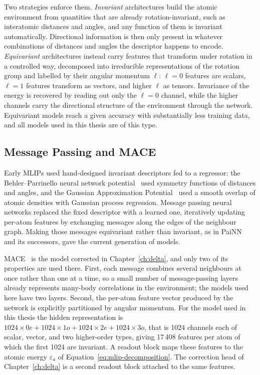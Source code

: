 Two strategies enforce them. \emph{Invariant} architectures build the atomic
environment from quantities that are already rotation-invariant, such as interatomic
distances and angles, and any function of them is invariant automatically. Directional
information is then only present in whatever combinations of distances and angles the
descriptor happens to encode. \emph{Equivariant} architectures instead carry features
that transform under rotation in a controlled way, decomposed into irreducible
representations of the rotation group and labelled by their angular momentum $\ell$:
$\ell = 0$ features are scalars, $\ell = 1$ features transform as vectors, and higher
$\ell$ as tensors. Invariance of the energy is recovered by reading out only the
$\ell = 0$ channel, while the higher channels carry the directional structure of the
environment through the network. Equivariant models reach a given accuracy with
substantially less training data, and all models used in this thesis are of this type.
 
\subsection{Message Passing and MACE}
\label{sec:mlip-mace}
 
Early MLIPs used hand-designed invariant descriptors fed to a regressor: the
Behler--Parrinello neural network potential~\cite{behler2007} used symmetry functions
of distances and angles, and the Gaussian Approximation Potential~\cite{bartok2010gap}
used a smooth overlap of atomic densities with Gaussian process regression. Message
passing neural networks replaced the fixed descriptor with a learned one, iteratively
updating per-atom features by exchanging messages along the edges of the neighbour
graph. Making those messages equivariant rather than invariant, as in
PaiNN~\cite{schutt2021painn} and its successors, gave the current generation of models.
 
MACE~\cite{batatia2022} is the model corrected in Chapter~\ref{ch:delta}, and only two
of its properties are used there. First, each message combines several neighbours at
once rather than one at a time, so a small number of message-passing layers already
represents many-body correlations in the environment; the models used here have two
layers. Second, the per-atom feature vector produced by the network is explicitly
partitioned by angular momentum. For the model used in this thesis the hidden
representation is $1024 \times 0e + 1024 \times 1o + 1024 \times 2e + 1024 \times 3o$,
that is 1024 channels each of scalar, vector, and two higher-order types, giving 17\,408
features per atom of which the first 1024 are invariant. A readout block maps these
features to the atomic energy $\varepsilon_a$ of Equation~\ref{eq:mlip-decomposition}.
The correction head of Chapter~\ref{ch:delta} is a second readout block attached to the
same features.
 
